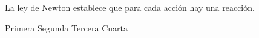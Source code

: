 
\question La \fillin \enspace ley de Newton establece que para cada acción
          hay una reacción.

  \begin{oneparchoices}
    \choice Primera
    \choice Segunda
    \CorrectChoice Tercera
    \choice Cuarta
  \end{oneparchoices}
  \answerline[C]
